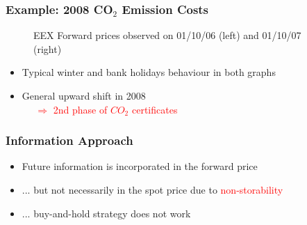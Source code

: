 \begin{frame}
  \frametitle{Example: 2008 CO$_2$ Emission Costs}
\vspace{-0.5cm}

\begin{figure}[htbp]
  \centering
  \caption{EEX Forward prices observed on 01/10/06 (left) and 01/10/07 (right)}
\end{figure}

\begin{itemize}
\item Typical winter and bank holidays behaviour in both graphs
\item General upward shift in 2008 \\ \vspace{0.2cm}
\textcolor{red}{$~~~~~~ \Rightarrow$ 2nd phase of $CO_2$ certificates}
\end{itemize}
\end{frame}



\begin{frame}
 \frametitle{Information Approach}
\vspace{-0.5cm}

\begin{itemize}
\item<1-> Future information is incorporated in the forward price
\item<2-> ... but not necessarily in the spot price due to \textcolor{red}{non-storability}
\item<3-> ... buy-and-hold strategy does not work
\end{itemize}
\end{frame}


